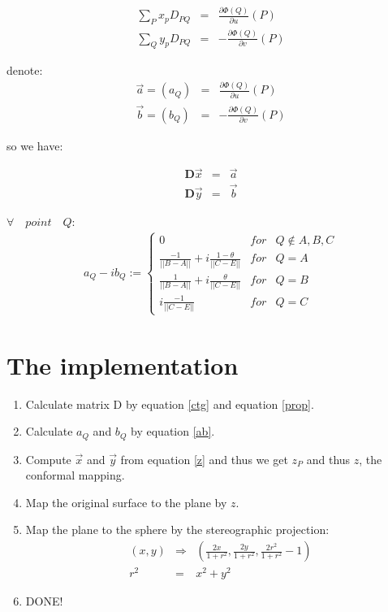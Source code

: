 \documentclass[letterpaper]{article}
\begin{document}
\begin{enumerate}
    \begin{eqnarray}
      \sum_{P}x_p D_{PQ} &=& \frac{\partial \Phi(Q)}{\partial u}(P) \nonumber\\
      \sum_{Q}y_p D_{PQ} &=& -\frac{\partial \Phi(Q)}{\partial v} (P)
    \end{eqnarray}  

    denote:
    \begin{eqnarray}
      \vec{a} = (a_Q) &=& \frac{\partial \Phi(Q)}{\partial u}(P) \nonumber \\
      \vec{b} = (b_Q) &=& -\frac{\partial \Phi(Q)}{\partial v} (P)
    \end{eqnarray}  

    so we have:

    \begin{eqnarray}
      \mathbf{D}\vec{x} &=& \vec{a} \nonumber \\
      \mathbf{D}\vec{y} &=& \vec{b} \label{z}
    \end{eqnarray}  

    $\forall \quad point \quad Q$:
    \begin{eqnarray}
      a_Q - ib_Q := \left\{
      \begin{array}{lcl}
        0 & for & Q \notin {A, B, C} \\
        \frac{-1}{||B-A||} + i\frac{1-\theta}{||C-E||} & for & Q = A \\
        \frac{1}{||B-A||} + i\frac{\theta}{||C-E||} & for & Q = B \\
        i\frac{-1}{||C-E||} & for & Q = C
      \end{array} \right. \label{ab}
    \end{eqnarray}  

  \end{enumerate}
  
  \section{The implementation}
  \begin{enumerate}
    \item Calculate matrix D by equation \ref{ctg} and equation \ref{prop}.
    \item Calculate $a_Q$ and $b_Q$ by equation \ref{ab}.
    \item Compute $\vec{x}$ and $\vec{y}$ from equation \ref{z} and
    thus we get $z_P$ and thus $z$, the conformal mapping.
    \item Map the original surface to the plane by $z$.
    \item Map the plane to the sphere by the stereographic projection:
    \begin{eqnarray}
      (x, y) &\Rightarrow& (\frac{2x}{1+r^2}, \frac{2y}{1+r^2},
      \frac{2r^2}{1+r^2}-1) \nonumber \\
      r^2 &=& x^2 + y^2
    \end{eqnarray}  

    \item DONE!
  \end{enumerate}
\end{document}
